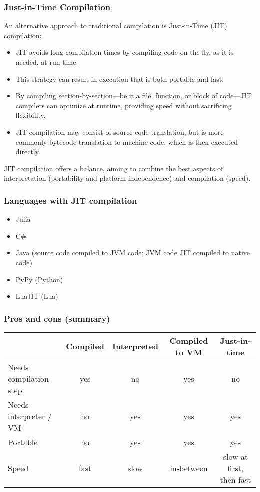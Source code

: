 \documentclass[12pt]{article}
\begin{document}
\subsubsection{Just-in-Time Compilation}

An alternative approach to traditional compilation is Just-in-Time (JIT) compilation:

\begin{itemize}
  \item JIT avoids long compilation times by compiling code on-the-fly, as it is needed, at run time.
  \item This strategy can result in execution that is both portable and fast.
  \item By compiling section-by-section—be it a file, function, or block of code—JIT compilers can optimize at runtime, providing speed without sacrificing flexibility.
  \item JIT compilation may consist of source code translation, but is more commonly bytecode translation to machine code, which is then executed directly. 
\end{itemize}

JIT compilation offers a balance, aiming to combine the best aspects of interpretation (portability and platform independence) and compilation (speed).

\subsubsection{Languages with JIT compilation}

\begin{itemize}
    \item Julia
    \item C\#
    \item Java (source code compiled to JVM code; JVM code JIT compiled to native code)
    \item PyPy (Python)
    \item LuaJIT (Lua)
\end{itemize}



\subsubsection{Pros and cons (summary)}

\begin{tabular}{lcccc}
\toprule
 & Compiled & Interpreted & Compiled to VM & Just-in-time \\
\midrule
Needs compilation step & yes & no & yes & no \\
Needs interpreter / VM & no & yes & yes & yes \\
Portable & no & yes & yes & yes \\
Speed & fast & slow & in-between & slow at first, then fast \\
\bottomrule
\end{tabular}
\end{document}
